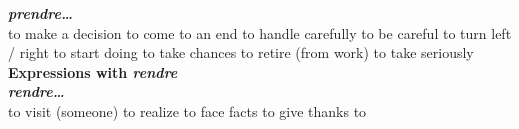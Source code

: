                     {\bf {\em prendre\ldots}}\\
   {to make a decision}
   {to come to an end}
   {to handle carefully}
   {to be careful}
   {to turn left / right}
   {to start doing}
   {to take chances}
   {to retire (from work)}
   {to take seriously}
     {\sffamily\bfseries Expressions with {\em rendre}}\\
                         {\bf {\em rendre\ldots}}\\
        {to visit (someone)}
        {to realize}
        {to face facts}
         {to give thanks to}
